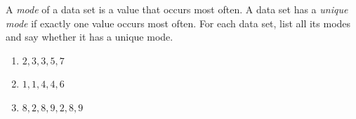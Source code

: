 A \emph{mode} of a data set is a value that occurs most often. A data set has a \emph{unique mode} if exactly one value occurs most often. For each data set, list all its modes and say whether it has a unique mode.
\begin{enumerate}
\item[(a)] $2,3,3,5,7$
\item[(b)] $1,1,4,4,6$
\item[(c)] $8,2,8,9,2,8,9$
\end{enumerate}
